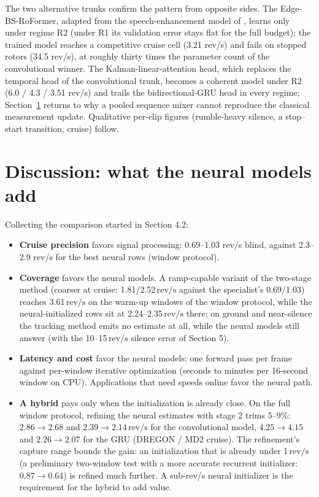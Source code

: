 \documentclass[journal]{IEEEtran}
\newcommand{\revps}{\ensuremath{\,\mathrm{rev/s}}}
\begin{document}
The two alternative trunks confirm the pattern from opposite sides. The
Edge-BS-RoFormer, adapted from the speech-enhancement model of
\cite{liu2025edgebsrof}, learns only under regime R2 (under R1 its
validation error stays flat for the full budget); the trained model
reaches a competitive cruise cell (3.21 rev/s) and fails on stopped
rotors (34.5 rev/s), at roughly thirty times the parameter count of the
convolutional winner. The Kalman-linear-attention head, which replaces
the temporal head of the convolutional trunk, becomes a coherent model
under R2 (6.0 / 4.3 / 3.51 rev/s) and trails the bidirectional-GRU head
in every regime; Section~\ref{sec:discussion} returns to why a pooled
sequence mixer cannot reproduce the classical measurement update. Qualitative per-clip figures (rumble-heavy silence, a
stop--start transition, cruise) follow.

\section{Discussion: what the neural models add}
\label{sec:discussion}

Collecting the comparison started in Section 4.2:

\begin{itemize}
\item \textbf{Cruise precision} favors signal processing: 0.69--1.03 rev/s
  blind, against 2.3--2.9 rev/s for the best neural rows (window protocol).
\item \textbf{Coverage} favors the neural models. A ramp-capable variant of
  the two-stage method (coarser at cruise: 1.81/2.52\revps{} against the
  specialist's 0.69/1.03) reaches 3.61\revps{} on the warm-up windows of the
  window protocol, while the neural-initialized rows sit at
  2.24--2.35\revps{} there; on ground and near-silence the tracking method
  emits no estimate at all, while the neural models still answer (with the
  10--15\revps{} silence error of Section 5).
\item \textbf{Latency and cost} favor the neural models: one forward pass per
  frame against per-window iterative optimization (seconds to minutes per
  16-second window on CPU). Applications that need speeds online favor the
  neural path.
\item \textbf{A hybrid} pays only when the initialization is already close.
  On the full window protocol, refining the neural estimates with stage 2
  trims 5--9\%: $2.86 \to 2.68$ and $2.39 \to 2.14$\revps{} for the
  convolutional model, $4.25 \to 4.15$ and $2.26 \to 2.07$ for the GRU
  (DREGON / MD2 cruise). The refinement's capture range bounds the gain: an
  initialization that is already under 1\revps{} (a preliminary two-window
  test with a more accurate recurrent initializer: $0.87 \to 0.64$) is
  refined much further. A sub-rev/s neural initializer is the requirement
  for the hybrid to add value.
\end{itemize}
\end{document}
